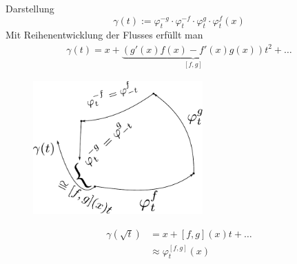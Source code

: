 \documentclass[ngerman]{tudscrreprt}
\begin{document}
Darstellung 
\begin{equation*}\gamma(t) := \varphi_t^{-g} \cdot \varphi_t^{-f} \cdot \varphi_t^g \cdot \varphi_t^f(x) \end{equation*} 
Mit Reihenentwicklung der Flusses erfüllt man 
\begin{align*}
\gamma(t) = x + \underbrace{(g'(x)f(x) - f'(x)g(x) )}_{[f,g]}t^2 + \dots
\end{align*}
\begin{figure}[H]
\centering
\def\svgwidth{200pt} 
  \includegraphics[width=6.5cm]{images/image332.pdf}
\end{figure}
\begin{align*}
\gamma(\sqrt{t}) &= x + [f,g](x)t + \dots\\ 
& \approx \varphi_t^{[f,g]} (x) 
\end{align*}
\end{document}
